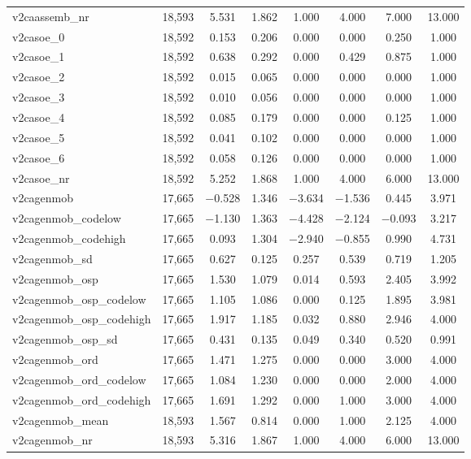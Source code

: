 \begin{table}[!htbp]
\begin{tabular}{@{\extracolsep{5pt}}lccccccc}
v2caassemb\_nr & 18,593 & 5.531 & 1.862 & 1.000 & 4.000 & 7.000 & 13.000 \\ 
v2casoe\_0 & 18,592 & 0.153 & 0.206 & 0.000 & 0.000 & 0.250 & 1.000 \\ 
v2casoe\_1 & 18,592 & 0.638 & 0.292 & 0.000 & 0.429 & 0.875 & 1.000 \\ 
v2casoe\_2 & 18,592 & 0.015 & 0.065 & 0.000 & 0.000 & 0.000 & 1.000 \\ 
v2casoe\_3 & 18,592 & 0.010 & 0.056 & 0.000 & 0.000 & 0.000 & 1.000 \\ 
v2casoe\_4 & 18,592 & 0.085 & 0.179 & 0.000 & 0.000 & 0.125 & 1.000 \\ 
v2casoe\_5 & 18,592 & 0.041 & 0.102 & 0.000 & 0.000 & 0.000 & 1.000 \\ 
v2casoe\_6 & 18,592 & 0.058 & 0.126 & 0.000 & 0.000 & 0.000 & 1.000 \\ 
v2casoe\_nr & 18,592 & 5.252 & 1.868 & 1.000 & 4.000 & 6.000 & 13.000 \\ 
v2cagenmob & 17,665 & $-$0.528 & 1.346 & $-$3.634 & $-$1.536 & 0.445 & 3.971 \\ 
v2cagenmob\_codelow & 17,665 & $-$1.130 & 1.363 & $-$4.428 & $-$2.124 & $-$0.093 & 3.217 \\ 
v2cagenmob\_codehigh & 17,665 & 0.093 & 1.304 & $-$2.940 & $-$0.855 & 0.990 & 4.731 \\ 
v2cagenmob\_sd & 17,665 & 0.627 & 0.125 & 0.257 & 0.539 & 0.719 & 1.205 \\ 
v2cagenmob\_osp & 17,665 & 1.530 & 1.079 & 0.014 & 0.593 & 2.405 & 3.992 \\ 
v2cagenmob\_osp\_codelow & 17,665 & 1.105 & 1.086 & 0.000 & 0.125 & 1.895 & 3.981 \\ 
v2cagenmob\_osp\_codehigh & 17,665 & 1.917 & 1.185 & 0.032 & 0.880 & 2.946 & 4.000 \\ 
v2cagenmob\_osp\_sd & 17,665 & 0.431 & 0.135 & 0.049 & 0.340 & 0.520 & 0.991 \\ 
v2cagenmob\_ord & 17,665 & 1.471 & 1.275 & 0.000 & 0.000 & 3.000 & 4.000 \\ 
v2cagenmob\_ord\_codelow & 17,665 & 1.084 & 1.230 & 0.000 & 0.000 & 2.000 & 4.000 \\ 
v2cagenmob\_ord\_codehigh & 17,665 & 1.691 & 1.292 & 0.000 & 1.000 & 3.000 & 4.000 \\ 
v2cagenmob\_mean & 18,593 & 1.567 & 0.814 & 0.000 & 1.000 & 2.125 & 4.000 \\ 
v2cagenmob\_nr & 18,593 & 5.316 & 1.867 & 1.000 & 4.000 & 6.000 & 13.000 \\ 

\end{tabular}
\end{table}
